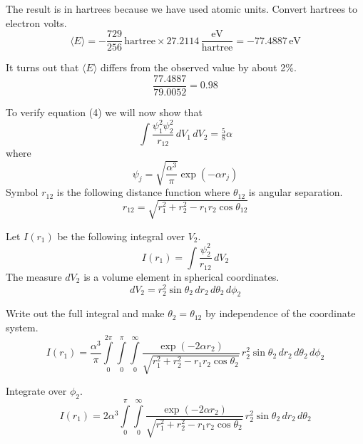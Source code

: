 \documentclass[12pt]{article}
\begin{document}
The result is in hartrees because we have used atomic units.
Convert hartrees to electron volts.
\begin{equation*}
\langle E\rangle=-\frac{729}{256}\,\text{hartree}\times27.2114\,\frac{\text{eV}}{\text{hartree}}=-77.4887\,\text{eV}
\end{equation*}

It turns out that $\langle E\rangle$ differs from the observed value by about 2\%.
\begin{equation*}
\frac{77.4887}{79.0052}=0.98
\end{equation*}

To verify equation (4) we will now show that
\begin{equation*}
\int\frac{\psi_1^2\psi_2^2}{r_{12}}\,dV_1\,dV_2=\tfrac{5}{8}\alpha
\end{equation*}
where
\begin{equation*}
\psi_j=\sqrt{\frac{\alpha^3}{\pi}}\exp\left(-\alpha r_j\right)
\end{equation*}
Symbol $r_{12}$ is the following distance function where $\theta_{12}$ is angular separation.
\begin{equation*}
r_{12}=\sqrt{r_1^2+r_2^2-r_1r_2\cos\theta_{12}}
\end{equation*}

Let $I(r_1)$ be the following integral over $V_2$.
\begin{equation*}
I(r_1)=\int\frac{\psi_2^2}{r_{12}}\,dV_2
\end{equation*}
The measure $dV_2$ is a volume element in spherical coordinates.
\begin{equation*}
dV_2=r_2^2\sin\theta_2\,dr_2\,d\theta_2\,d\phi_2
\end{equation*}

Write out the full integral and make $\theta_2=\theta_{12}$ by independence of the coordinate system.
\begin{equation*}
I(r_1)=\frac{\alpha^3}{\pi}
\int\limits_0^{2\pi}\int\limits_0^\pi\int\limits_0^\infty
\frac{\exp(-2\alpha r_2)}{\sqrt{r_1^2+r_2^2-r_1r_2\cos\theta_2}}
\,r_2^2\sin\theta_2\,dr_2\,d\theta_2\,d\phi_2
\end{equation*}

Integrate over $\phi_2$.
\begin{equation*}
I(r_1)=
2\alpha^3\int\limits_0^\pi\int\limits_0^\infty
\frac{\exp(-2\alpha r_2)}{\sqrt{r_1^2+r_2^2-r_1r_2\cos\theta_2}}
\,r_2^2\sin\theta_2\,dr_2\,d\theta_2
\end{equation*}
\end{document}
